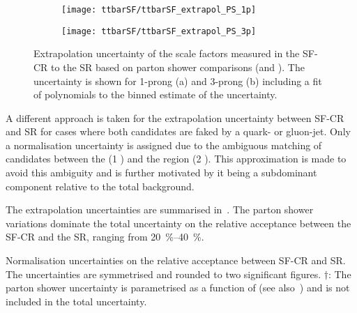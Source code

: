 \begin{figure}[htbp]
  \centering

  \begin{subfigure}[t]{.495\textwidth}
    \texttt{[image: ttbarSF/ttbarSF\_extrapol\_PS\_1p]}
    \caption{}
    \label{fig:ttbarSF_extrapol_shape_a}
  \end{subfigure}\hfill%
  \begin{subfigure}[t]{.495\textwidth}
    \texttt{[image: ttbarSF/ttbarSF\_extrapol\_PS\_3p]}
    \caption{}
    \label{fig:ttbarSF_extrapol_shape_b}
  \end{subfigure}

  \caption{Extrapolation uncertainty of the scale factors measured in
    the SF-CR to the \hadhad SR based on parton shower comparisons
    (\PYTHIA[8] and \HERWIG[7]). The uncertainty is shown for 1-prong
    (a) and 3-prong \faketauhadvis (b) including a fit of polynomials
    to the binned estimate of the uncertainty. }
  \label{fig:ttbarSF_extrapol_shape}
\end{figure}

A different approach is taken for the extrapolation uncertainty
between SF-CR and \hadhad SR for cases where both \tauhadvis
candidates are faked by a quark- or gluon-jet. Only a normalisation
uncertainty is assigned due to the ambiguous matching of \tauhadvis
candidates between the \lephad (1 \faketauhadvis) and the \hadhad
region (2 \faketauhadvis). This approximation is made to avoid this
ambiguity and is further motivated by it being a subdominant component
relative to the total \ttbarFakes background.

The extrapolation uncertainties are summarised
in~. The parton shower
variations dominate the total uncertainty on the relative acceptance
between the SF-CR and the SR, ranging from \SIrange{20}{40}{\percent}.

\begin{table}[htbp]
  \centering

  \caption{Normalisation uncertainties on the relative acceptance
    between SF-CR and SR. The uncertainties are symmetrised and
    rounded to two significant figures. $\dagger$: The parton shower
    uncertainty is parametrised as a function of \tauhadvis \pT (see
    also~) and is not included in the
    total uncertainty.}%
  \label{tab:ttbarSF_acceptance_uncertainty}

  
\end{table}


